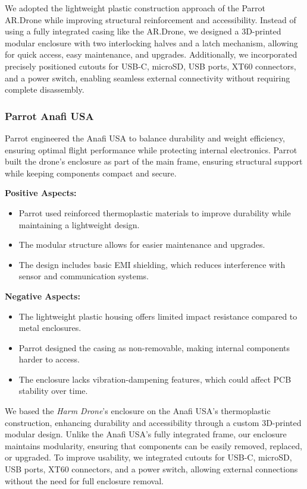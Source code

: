 \documentclass[12pt]{article}
\begin{document}
We adopted the lightweight plastic construction approach of the Parrot AR.Drone while improving structural reinforcement and accessibility. Instead of using a fully integrated casing like the AR.Drone, we designed a 3D-printed modular enclosure with two interlocking halves and a latch mechanism, allowing for quick access, easy maintenance, and upgrades. Additionally, we incorporated precisely positioned cutouts for USB-C, microSD, USB ports, XT60 connectors, and a power switch, enabling seamless external connectivity without requiring complete disassembly.

\subsubsection{Parrot Anafi USA}

Parrot engineered the Anafi USA to balance durability and weight efficiency, ensuring optimal flight performance while protecting internal electronics. Parrot built the drone’s enclosure as part of the main frame, ensuring structural support while keeping components compact and secure.

\textbf{Positive Aspects:}
\begin{itemize}
    \item Parrot used reinforced thermoplastic materials to improve durability while maintaining a lightweight design.
    \item The modular structure allows for easier maintenance and upgrades.
    \item The design includes basic EMI shielding, which reduces interference with sensor and communication systems.
\end{itemize}

\textbf{Negative Aspects:}
\begin{itemize}
    \item The lightweight plastic housing offers limited impact resistance compared to metal enclosures.
    \item Parrot designed the casing as non-removable, making internal components harder to access.
    \item The enclosure lacks vibration-dampening features, which could affect PCB stability over time.
\end{itemize}

We based the \textit{Harm Drone}’s enclosure on the Anafi USA’s thermoplastic construction, enhancing durability and accessibility through a custom 3D-printed modular design. Unlike the Anafi USA’s fully integrated frame, our enclosure maintains modularity, ensuring that components can be easily removed, replaced, or upgraded. To improve usability, we integrated cutouts for USB-C, microSD, USB ports, XT60 connectors, and a power switch, allowing external connections without the need for full enclosure removal.
\end{document}
